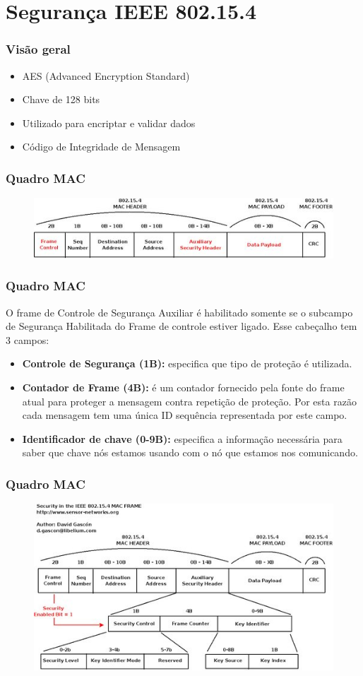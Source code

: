 \documentclass{beamer}
\begin{document}
  \section{Segurança IEEE 802.15.4}
  \frame
  {
    \frametitle{Visão geral}
    \begin{itemize}
      \item AES (Advanced Encryption Standard)
      \item Chave de 128 bits
      \item Utilizado para encriptar e validar dados
      \item Código de Integridade de Mensagem
    \end{itemize} 
  }

    \frame
  {
    \frametitle{Quadro MAC}
        \begin{figure}[ht!]
	  \centering
	  \includegraphics[width=.8\textwidth]{figuras/mac802154_0med}
	  \label{fig:mac1}
    \end{figure}
  }

  \frame
  {
    \frametitle{Quadro MAC}
    O frame de Controle de Segurança Auxiliar é habilitado somente se o subcampo de Segurança Habilitada do Frame de controle estiver ligado. Esse
    cabeçalho tem 3 campos:
    \begin{itemize}
      \item \textbf{Controle de Segurança (1B):} especifica que tipo de proteção é utilizada.
      \item \textbf{Contador de Frame (4B):} é um contador fornecido pela fonte do frame atual para proteger a mensagem contra repetição de proteção. 
	    Por esta razão cada mensagem tem uma única ID sequência representada por este campo.
      \item \textbf{Identificador de chave (0-9B):} especifica a informação necessária para saber que chave nós estamos usando com o nó que estamos 
	    nos comunicando.
    \end{itemize}
  }

    \frame
  {
    \frametitle{Quadro MAC}
        \begin{figure}[ht!]
	  \centering
	  \includegraphics[width=.8\textwidth]{figuras/mac8021540med}
	  \label{fig:mac2}
    \end{figure}
  }
\end{document}
